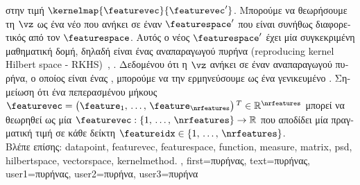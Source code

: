 {{{		στην τιμή $\kernelmap{\featurevec}{\featurevec'}$. Μπορούμε να θεωρήσουμε τη}  $\vz$ \foreignlanguage{greek}{ως 
		ένα νέο}  \foreignlanguage{greek}{που ανήκει σε έναν}  $\featurespace'$ 
		\foreignlanguage{greek}{που είναι συνήθως διαφορετικός από τον $\featurespace$. Αυτός ο νέος}  $\featurespace'$ 
		\foreignlanguage{greek}{έχει μία συγκεκριμένη μαθηματική δομή, δηλαδή είναι ένας}  
		\foreignlanguage{greek}{αναπαραγωγού πυρήνα} (reproducing kernel Hilbert space - RKHS)~\cite{LearningKernelsBook}, \cite{LampertNowKernel}.
     		\foreignlanguage{greek}{Δεδομένου ότι η $\vz$ ανήκει σε έναν}  \foreignlanguage{greek}{αναπαραγωγού 
		πυρήνα, ο οποίος είναι ένας} , \foreignlanguage{greek}{μπορούμε να την ερμηνεύσουμε ως ένα γενικευμένο}
	 	. \foreignlanguage{greek}{Σημείωση ότι ένα}  \foreignlanguage{greek}{πεπερασμένου μήκους 
		$\featurevec=\big(\feature_{1}, \,\ldots, \,\feature_{\nrfeatures} \big)\,^{T} \in \mathbb{R}^{\nrfeatures}$ 
	 	μπορεί να θεωρηθεί ως μία}  $\featurevec: \{1, \,\ldots, \,\nrfeatures\} \rightarrow \mathbb{R}$ 
	 	\foreignlanguage{greek}{που αποδίδει μία πραγματική τιμή σε κάθε δείκτη} $\featureidx \in \{1, \,\ldots, \,\nrfeatures\}$. 
		\\
          	\foreignlanguage{greek}{Βλέπε επίσης:} \gls{datapoint}, \gls{featurevec}, \gls{featurespace}, \gls{function}, \gls{measure}, \gls{matrix}, \gls{psd}, 
		\gls{hilbertspace}, \gls{vectorspace}, \gls{kernelmethod}. },
	first={\foreignlanguage{greek}{πυρήνας}},
	text={\foreignlanguage{greek}{πυρήνας}},
	user1={\foreignlanguage{greek}{πυρήνας}}, %
  	user2={\foreignlanguage{greek}{πυρήνα}}, %
	user3={\foreignlanguage{greek}{πυρήνα}} %
}

